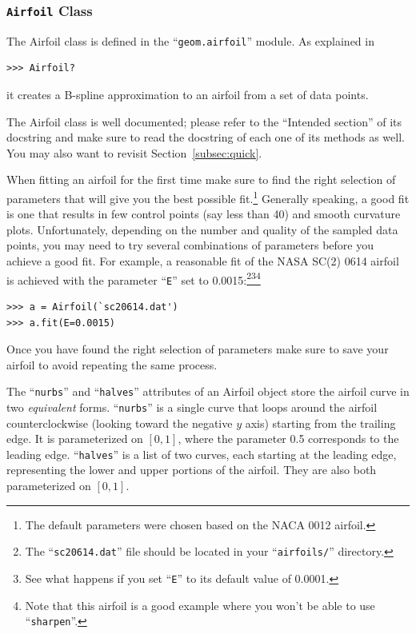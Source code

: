\documentclass[]{article}
\begin{document}
\subsubsection{\texttt{Airfoil} Class}
\label{subsubsec:airfoil}

The Airfoil class is defined in the ``\texttt{geom.airfoil}'' module.  
As explained in
\begin{verbatim}
>>> Airfoil?
\end{verbatim}
it creates a B-spline approximation to an airfoil from a set of data 
points.

The Airfoil class is well documented; please refer to the ``Intended 
section'' of its docstring and make sure to read the docstring of each 
one of its methods as well.  You may also want to revisit 
Section~\ref{subsec:quick}.

When fitting an airfoil for the first time make sure to find the right 
selection of parameters that will give you the best possible 
fit.\footnote{The default parameters were chosen based on the NACA 0012 
airfoil.}  Generally speaking, a good fit is one that results in few 
control points (say less than 40) and smooth curvature plots.  
Unfortunately, depending on the number and quality of the sampled data 
points, you may need to try several combinations of parameters before 
you achieve a good fit.  For example, a reasonable fit of the NASA SC(2) 
0614 airfoil is achieved with the parameter ``\texttt{E}'' set to 
0.0015:\footnote{The ``\texttt{sc20614.dat}'' file should be located in 
your ``\texttt{airfoils/}'' directory.}\footnote{See what happens if you 
set ``\texttt{E}'' to its default value of 0.0001.}\footnote{Note that 
this airfoil is a good example where you won't be able to use 
``\texttt{sharpen}''.}
\begin{verbatim}
>>> a = Airfoil(`sc20614.dat')
>>> a.fit(E=0.0015)
\end{verbatim}

Once you have found the right selection of parameters make sure to save 
your airfoil to avoid repeating the same process.

The ``\texttt{nurbs}'' and ``\texttt{halves}'' attributes of an Airfoil 
object store the airfoil curve in two \emph{equivalent} forms.  
``\texttt{nurbs}'' is a single curve that loops around the airfoil 
counterclockwise (looking toward the negative $y$ axis) starting from 
the trailing edge.  It is parameterized on $[0,1]$, where the parameter 
0.5 corresponds to the leading edge.  ``\texttt{halves}'' is a list of 
two curves, each starting at the leading edge, representing the lower 
and upper portions of the airfoil.  They are also both parameterized on 
$[0,1]$.
\end{document}
